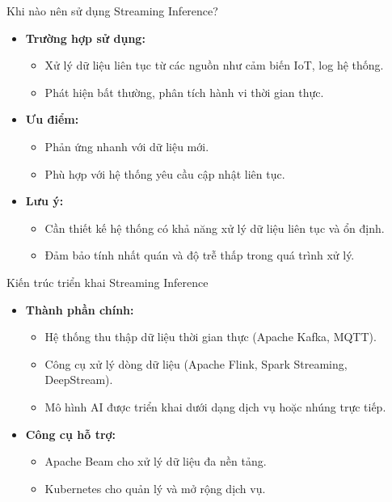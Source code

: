 \documentclass{beamer}
\begin{document}
\begin{frame}{Khi nào nên sử dụng Streaming Inference?}
    \begin{itemize}
        \item \textbf{Trường hợp sử dụng:}
        \begin{itemize}
            \item Xử lý dữ liệu liên tục từ các nguồn như cảm biến IoT, log hệ thống.
            \item Phát hiện bất thường, phân tích hành vi thời gian thực.
        \end{itemize}
        \item \textbf{Ưu điểm:}
        \begin{itemize}
            \item Phản ứng nhanh với dữ liệu mới.
            \item Phù hợp với hệ thống yêu cầu cập nhật liên tục.
        \end{itemize}
        \item \textbf{Lưu ý:}
        \begin{itemize}
            \item Cần thiết kế hệ thống có khả năng xử lý dữ liệu liên tục và ổn định.
            \item Đảm bảo tính nhất quán và độ trễ thấp trong quá trình xử lý.
        \end{itemize}
    \end{itemize}
\end{frame}

\begin{frame}{Kiến trúc triển khai Streaming Inference}
    \begin{itemize}
        \item \textbf{Thành phần chính:}
        \begin{itemize}
            \item Hệ thống thu thập dữ liệu thời gian thực (Apache Kafka, MQTT).
            \item Công cụ xử lý dòng dữ liệu (Apache Flink, Spark Streaming, DeepStream).
            \item Mô hình AI được triển khai dưới dạng dịch vụ hoặc nhúng trực tiếp.
        \end{itemize}
        \item \textbf{Công cụ hỗ trợ:}
        \begin{itemize}
            \item Apache Beam cho xử lý dữ liệu đa nền tảng.
            \item Kubernetes cho quản lý và mở rộng dịch vụ.
        \end{itemize}
    \end{itemize}
\end{frame}
    
\end{document}

